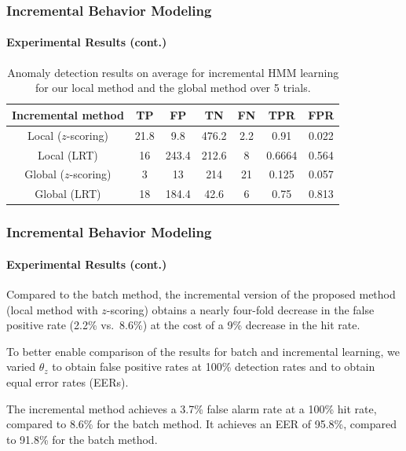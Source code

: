 \begin{frame}
    \frametitle{Incremental Behavior Modeling}
    \framesubtitle{Experimental Results (cont.)}

    \begin{table}
        \caption{Anomaly detection results on average for
            incremental HMM learning for our local method and the global
            method over 5 trials.}
            \centering
            \begin{tabular}{c|c|c|c|c|c|c}
                \hline
                Incremental method & TP & FP & TN & FN & TPR & FPR \\
                \hline \hline
                Local ($z$-scoring) & 21.8 & 9.8  & 476.2  & 2.2 & 0.91 & 0.022 \\ \hline
                Local (LRT) & 16 & 243.4 & 212.6 & 8 & 0.6664 & 0.564 \\ \hline
                Global ($z$-scoring)  & 3 & 13 & 214 & 21 & 0.125 & 0.057 \\ \hline
                Global (LRT)  & 18 & 184.4 & 42.6 & 6 & 0.75 & 0.813 \\ \hline
            \end{tabular}
        \label{tab:iml-detection-results}
    \end{table}

\end{frame}


\begin{frame}
    \frametitle{Incremental Behavior Modeling}
    \framesubtitle{Experimental Results (cont.)}

    Compared to the batch method, the
    incremental version of the proposed method (local method with
    $z$-scoring) obtains a nearly four-fold decrease in the false positive
    rate (2.2\% vs.\ 8.6\%) at the cost of a 9\% decrease in the hit rate.

    \bigskip
    
    To better enable comparison of the
    results for batch and incremental learning, we varied $\theta_z$ to
    obtain false positive rates at 100\% detection rates and to obtain
    equal error rates (EERs). 
    
    \bigskip
    
    The incremental method achieves a 3.7\%
    false alarm rate at a 100\% hit rate, compared to 8.6\% for the batch
    method.  It achieves an EER of 95.8\%, compared to 91.8\% for the
    batch method.

\end{frame}

